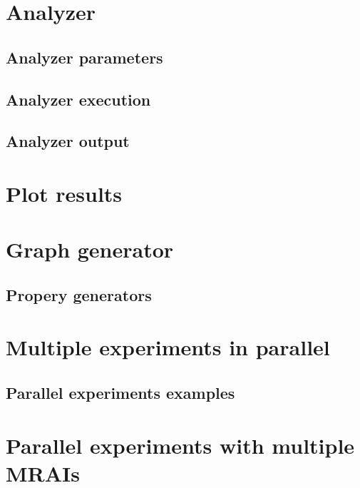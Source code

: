 \documentclass[10pt,journal,onecolumn]{IEEEtran}
\begin{document}
\section{Analyzer}
\label{sec:analyzer}

\subsection{Analyzer parameters}
\label{subsec:anal_param}

\subsection{Analyzer execution}
\label{subsec:anal_exec}

\subsection{Analyzer output}
\label{subsec:anal_output}

\section{Plot results}
\label{sec:plot_results}

\section{Graph generator}
\label{sec:graph_generator}

\subsection{Propery generators}
\label{sec:graph_propery_generators}

\section{Multiple experiments in parallel}
\label{sec:multiple_experiments}

\subsection{Parallel experiments examples}
\label{subsec:parallel_examples}

\section{Parallel experiments with multiple MRAIs}
\label{sec:parallel_mrais}
\end{document}
